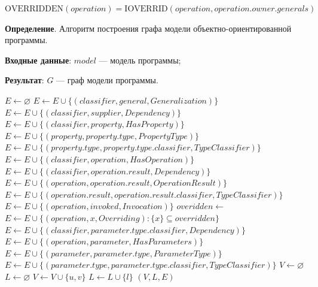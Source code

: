 $\textrm{OVERRIDDEN}(operation) = \textrm{IOVERRID}(operation, operation.owner.generals)$

\textbf{Определение}. Алгоритм построения графа модели объектно-ориентированной программы.

\textbf{Входные данные}: $model$ --- модель программы;

\textbf{Результат}: $G$ --- граф модели программы.

\begin{algorithmic}
    \State $E \gets \varnothing$
            \State $E \gets E \cup \{ ( classifier, general, Generalization ) \}$
        \EndFor
            \State $E \gets E \cup \{ ( classifier, supplier, Dependency ) \}$
        \EndFor
            \State $E \gets E \cup \{ ( classifier, property, HasProperty ) \}$
            \State $E \gets E \cup \{ ( property, property.type, PropertyType ) \}$
            \State $E \gets E \cup \{ ( property.type, property.type.classifier, TypeClassifier ) \}$
        \EndFor
            \State $E \gets E \cup \{ ( classifier, operation, HasOperation ) \}$
                \State $E \gets E \cup \{ ( classifier, operation.result, Dependency ) \}$
                \State $E \gets E \cup \{ ( operation, operation.result, OperationResult ) \}$
                \State $E \gets E \cup \{ ( operation.result, operation.result.classifier, TypeClassifier ) \}$
            \EndIf
                \State $E \gets E \cup \{ ( operation, invoked, Invocation ) \}$
            \EndFor
            \State $overidden \gets$ 
                \State $E \gets E \cup \{ ( operation, x, Overriding ) : \{ x \} \subseteq overridden \}$
            \EndIf
                \State $E \gets E \cup \{ ( classifier, parameter.type.classifier, Dependency ) \}$
                \State $E \gets E \cup \{ ( operation, parameter, HasParameters ) \}$
                \State $E \gets E \cup \{ ( parameter, parameter.type, ParameterType ) \}$
                \State $E \gets E \cup \{ ( parameter.type, parameter.type.classifier, TypeClassifier ) \}$
            \EndFor
        \EndFor
    \EndFor
    \State $V \gets \varnothing$
    \State $L \gets \varnothing$
        \State $V \gets V \cup \{ u, v \}$
        \State $L \gets L \cup \{ l \}$
    \EndFor
    \State \Return $(V, L, E)$
\EndFunction
\end{algorithmic}

